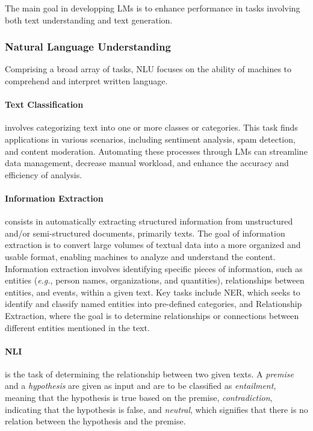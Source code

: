 The main goal in developping \acp{LM} is to enhance performance in tasks involving both text understanding and text generation. 

\subsubsection{Natural Language Understanding}

Comprising a broad array of tasks, \ac{NLU} focuses on the ability of machines to comprehend and interpret written language. 

\paragraph{Text Classification} involves categorizing text into one or more classes or categories. This task finds applications in various scenarios, including sentiment analysis, spam detection, and content moderation. Automating these processes through \acp{LM} can streamline data management, decrease manual workload, and enhance the accuracy and efficiency of analysis. 

\paragraph{Information Extraction} consists in automatically extracting structured information from unstructured and/or semi-structured documents, primarily texts. The goal of information extraction is to convert large volumes of textual data into a more organized and usable format, enabling machines to analyze and understand the content. Information extraction involves identifying specific pieces of information, such as entities (\textit{e.g.}, person names, organizations, and quantities), relationships between entities, and events, within a given text. Key tasks include \ac{NER}, which seeks to identify and classify named entities into pre-defined categories, and Relationship Extraction, where the goal is to determine relationships or connections between different entities mentioned in the text. 

\paragraph{\ac{NLI}} is the task of determining the relationship between two given texts. A \textit{premise} and a \textit{hypothesis} are given as input and are to be classified as \textit{entailment}, meaning that the hypothesis is true based on the premise, \textit{contradiction}, indicating that the hypothesis is false, and \textit{neutral}, which signifies that there is no relation between the hypothesis and the premise.

